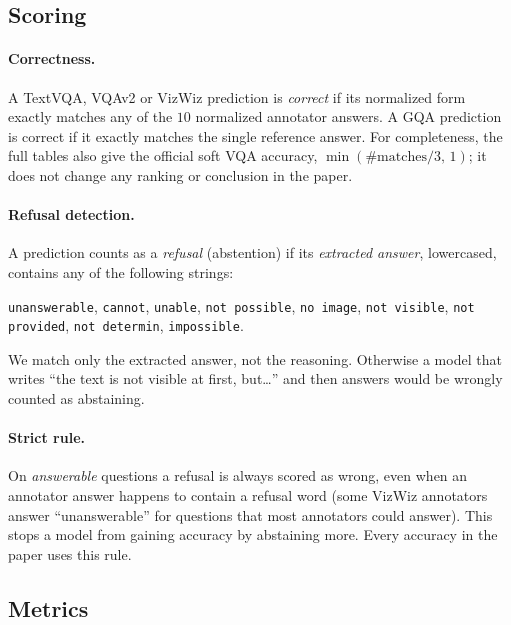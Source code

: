 \subsection{Scoring}
\label{sec:supp_eval_scoring}

\paragraph{Correctness.}
A TextVQA, VQAv2 or VizWiz prediction is \emph{correct} if its normalized form exactly
matches any of the $10$ normalized annotator answers. A GQA prediction is correct if it
exactly matches the single reference answer. For completeness, the full tables also give
the official soft VQA accuracy, $\min(\#\text{matches}/3,\,1)$; it does not change any
ranking or conclusion in the paper.

\paragraph{Refusal detection.}
A prediction counts as a \emph{refusal} (abstention) if its \emph{extracted answer},
lowercased, contains any of the following strings:
\begin{center}\small
\texttt{unanswerable}, \texttt{cannot}, \texttt{unable}, \texttt{not possible},
\texttt{no image}, \texttt{not visible}, \texttt{not provided}, \texttt{not determin},
\texttt{impossible}.
\end{center}
We match only the extracted answer, not the reasoning. Otherwise a model that writes
``the text is not visible at first, but\dots'' and then answers would be wrongly counted
as abstaining.

\paragraph{Strict rule.}
On \emph{answerable} questions a refusal is always scored as wrong, even when an
annotator answer happens to contain a refusal word (some VizWiz annotators answer
``unanswerable'' for questions that most annotators could answer). This stops a model from
gaining accuracy by abstaining more. Every accuracy in the paper uses this rule.

\subsection{Metrics}
\label{sec:supp_eval_metrics}

